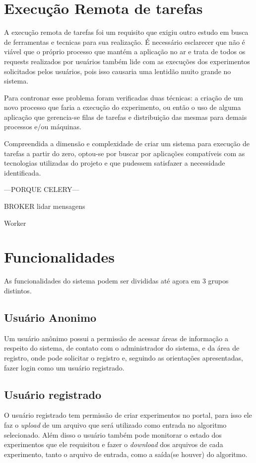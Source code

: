 \documentclass[tg]{mdtufsm}
\begin{document}
\section{Execução Remota de tarefas}
A execução remota de tarefas foi um requisito que exigiu outro estudo em busca de ferramentas e tecnicas para sua realização. É necessário esclarecer que não é viável que o próprio processo que mantém a aplicação no ar e trata de todos os requests realizados por usuários também lide com as execuções dos experimentos solicitados pelos usuários, pois isso causaria uma lentidão muito grande no sistema.

Para contronar esse problema foram verificadas duas técnicas: a criação de um novo processo que faria a execução do experimento, ou então o uso de alguma aplicação que gerencia-se filas de tarefas e distribuição das mesmas para demais processos e/ou máquinas.

Compreendida a dimensão e complexidade de criar um sistema para execução de tarefas a partir do zero, optou-se por buscar por aplicações compatíveis com as tecnologias utilizadas do projeto e que pudessem satisfazer a necessidade identificada.

---PORQUE CELERY---

BROKER lidar mensagens

Worker

\section{Funcionalidades}
As funcionalidades do sistema podem ser divididas até agora em 3 grupos distintos.
\subsection{Usuário Anonimo}
Um usuário anônimo possui a permissão de acessar áreas de informação a respeito do sistema, de contato com o administrador do sistema, e da área de registro, onde pode solicitar o registro e, seguindo as orientações apresentadas, fazer login como um usuário registrado.
\subsection{Usuário registrado}
O usuário registrado tem permissão de criar experimentos no portal, para isso ele faz o \emph{upload} de um arquivo que será utilizado como entrada no algoritmo selecionado. Além disso o usuário também pode monitorar o estado dos experimentos que ele requisitou e fazer o \emph{download} dos arquivos de cada experimento, tanto o arquivo de entrada, como a saída(se houver) do algoritmo.
\end{document}
